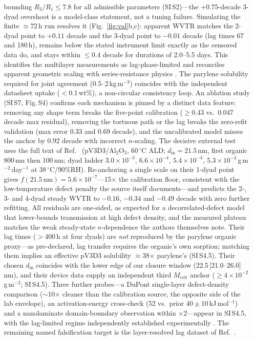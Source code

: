 \documentclass[11pt]{article}
\begin{document}
bounding $R_3/R_1\le7.8$ for all admissible parameters (SI\,S2)---the $+0.75$-decade 3-dyad overshoot is a model-class statement, not a tuning failure. Simulating the finite $\approx$72\,h run resolves it (Fig.~\ref{fig:val}b,c): apparent WVTR matches the 2-dyad point to $+0.11$ decade and the 3-dyad point to $-0.01$ decade (lag times 67 and 180\,h), remains below the stated instrument limit exactly as the censored data do, and stays within $\le0.4$ decade for durations of 2.0--5.5 days. This identifies the multilayer measurements as lag-phase-limited and reconciles apparent geometric scaling with series-resistance physics \cite{graff2004}. The parylene solubility required for joint agreement (0.5--2\,kg\,m$^{-3}$) coincides with the independent datasheet uptake ($<$0.1\,wt\%), a non-circular consistency loop. An ablation study (SI\,S7, Fig.\,S4) confirms each mechanism is pinned by a distinct data feature: removing any shape term breaks the five-point calibration ($\ge$0.43 vs.\ 0.047 decade max residual), removing the tortuous path or the lag breaks the zero-refit validation (max error 0.33 and 0.69 decade), and the uncalibrated model misses the anchor by 0.92 decade with incorrect $n$-scaling. The decisive external test uses the full text of Ref.~\cite{lee2018} (pV3D3/Al$_2$O$_3$, 60\,$^{\circ}$C ALD; $d_{\mathrm{in}}=21.5$\,nm, first organic 800\,nm then 100\,nm; dyad ladder $3.0\times10^{-3}$, $6.6\times10^{-4}$, $5.4\times10^{-4}$, $5.3\times10^{-4}$\,g\,m$^{-2}$\,day$^{-1}$ at 38\,$^{\circ}$C/90\%RH). Re-anchoring a single scale on their 1-dyad point gives $f(21.5\,\mathrm{nm})=5.6\times10^{-7}$---15$\times$ the calibration floor, consistent with the low-temperature defect penalty the source itself documents---and predicts the 2-, 3- and 4-dyad steady WVTR to $-0.16$, $-0.34$ and $-0.49$ decade with zero further refitting. All residuals are one-sided, as expected for a decorrelated-defect model that lower-bounds transmission at high defect density, and the measured plateau matches the weak steady-state $n$-dependence the authors themselves note. Their lag times ($>$400\,h at four dyads) are \emph{not} reproduced by the parylene organic proxy---as pre-declared, lag transfer requires the organic's own sorption; matching them implies an effective pV3D3 solubility $\approx$38$\times$ parylene's (SI\,S4.5). Their chosen $d_{\mathrm{in}}$ coincides with the lower edge of our closure window (22.5\,[21.0--26.0]\,nm), and their device data supply an independent third $M_{\mathrm{crit}}$ anchor ($\ge4\times10^{-2}$\,g\,m$^{-2}$; SI\,S4.5). Three further probes---a DuPont single-layer defect-density comparison ($\sim$10$\times$ cleaner than the calibration source, the opposite side of the lab envelope), an activation-energy cross-check (52 vs.\ prior $40\pm10$\,kJ\,mol$^{-1}$) and a nanolaminate domain-boundary observation within $\times$2---appear in SI\,S4.5, with the lag-limited regime independently established experimentally \cite{graff2004}. The remaining named falsification target is the layer-resolved lag dataset of Ref.~\cite{kiese2019}.
\end{document}
